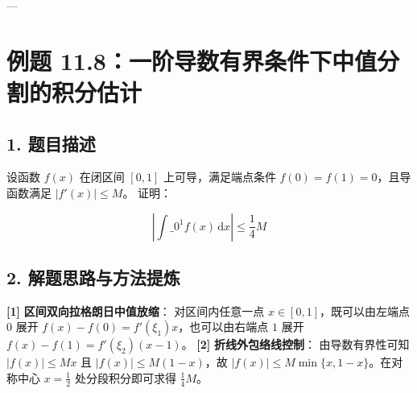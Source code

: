 \documentclass[11pt,a4paper,UTF8]{ctexart}
\begin{document}
---


\section{例题 11.8：一阶导数有界条件下中值分割的积分估计}


\subsection{1. 题目描述}
设函数 $f(x)$ 在闭区间 $[0, 1]$ 上可导，满足端点条件 $f(0) = f(1) = 0$，且导函数满足 $|f'(x)| \le M$。
证明：

\begin{equation*}
\left| \int\_0^1 f(x)\,\mathrm{d}x \right| \le \frac{1}{4} M
\end{equation*}



\subsection{2. 解题思路与方法提炼}
\begin{solbox}[分步推导与答题规范]
\textbf{[1]}  \textbf{区间双向拉格朗日中值放缩}：
对区间内任意一点 $x \in [0, 1]$，既可以由左端点 $0$ 展开 $f(x) - f(0) = f'(\xi_1)x$，也可以由右端点 $1$ 展开 $f(x) - f(1) = f'(\xi_2)(x-1)$。
\textbf{[2]}  \textbf{折线外包络线控制}：
由导数有界性可知 $|f(x)| \le M x$ 且 $|f(x)| \le M(1-x)$，故 $|f(x)| \le M \min\{x, 1-x\}$。在对称中心 $x = \frac{1}{2}$ 处分段积分即可求得 $\frac{1}{4}M$。
\end{solbox}
\end{document}
